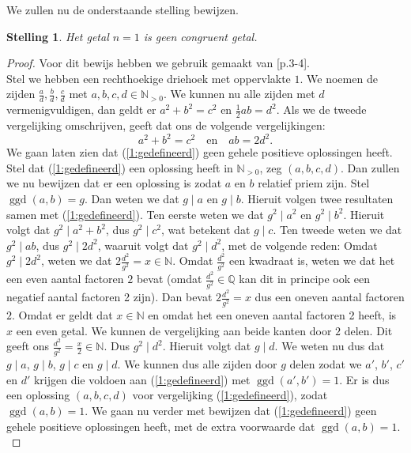 \documentclass[12pt,reqno]{article}
\newcommand*{\NN}{\ensuremath{\mathbb{N}}}
\newcommand*{\QQ}{\ensuremath{\mathbb{Q}}}
\newcommand*{\NO}{\ensuremath{\mathbb{N}_{>0}}}
\theoremstyle{theorem}
\newtheorem{theorem}{Stelling}
\theoremstyle{definition}
\DeclareMathOperator{\ggd}{ggd}
\begin{document}
	We zullen nu de onderstaande stelling bewijzen.
	\begin{theorem}
		Het getal $n=1$ is geen congruent getal.
	\end{theorem}
	\begin{proof}
		Voor dit bewijs hebben we gebruik gemaakt van \cite{Conrad}[p.3-4].\\
		Stel we hebben een rechthoekige driehoek met oppervlakte $1$. We noemen de zijden $\frac{a}{d}, \frac{b}{d}, \frac{c}{d}$ met $a,b,c,d\in\NO$. We kunnen nu alle zijden met $d$ vermenigvuldigen, dan geldt er $a^2 + b^2 = c ^2$ en $\frac{1}{2}ab = d^2$. Als we de tweede vergelijking omschrijven, geeft dat ons de volgende vergelijkingen:
		\begin{equation}\label{1:gedefineerd}
			a^2 + b^2 = c^2 \quad \text{en} \quad ab = 2d^2.
		\end{equation}
		We gaan laten zien dat (\ref{1:gedefineerd}) geen gehele positieve oplossingen heeft.\\
		
		Stel dat (\ref{1:gedefineerd}) een oplossing heeft in $\NO$, zeg $(a, b, c, d)$. Dan zullen we nu bewijzen dat er een oplossing is zodat $a$ en $b$ relatief priem zijn. Stel $\ggd(a,b) = g$. Dan weten we dat $g \mid a$ en $g \mid b$. Hieruit volgen twee resultaten samen met (\ref{1:gedefineerd}). Ten eerste weten we dat $g^2 \mid a^2$ en $g^2 \mid b^2$. Hieruit volgt dat $g^2 \mid a^2 + b^2$, dus $g^2 \mid c^2$, wat betekent dat $g \mid c$. Ten tweede weten we dat $g^2 \mid ab$, dus $g^2 \mid 2d^2$, waaruit volgt dat $g^2 \mid d^2$, met de volgende reden: Omdat $g^2 \mid 2d^2$, weten we dat $2\frac{d^2}{g^2} = x \in\NN$. Omdat $\frac{d^2}{g^2}$ een kwadraat is, weten we dat het een even aantal factoren $2$ bevat (omdat $\frac{d^2}{g^2}\in\QQ$ kan dit in principe ook een negatief aantal factoren 2 zijn). Dan bevat $2\frac{d^2}{g^2} = x$ dus een oneven aantal factoren $2$. Omdat er geldt dat $x \in\NN$ en omdat het een oneven aantal factoren 2 heeft, is $x$ een even getal. We kunnen de vergelijking aan beide kanten door $2$ delen. Dit geeft ons $\frac{d^2}{g^2}=\frac{x}{2} \in\NN$. Dus $g^2 \mid d^2$. Hieruit volgt dat $g \mid d$. We weten nu dus dat $g \mid a$, $g \mid b$, $g \mid c$ en $g \mid d$. We kunnen dus alle zijden door $g$ delen zodat we $a'$, $b'$, $c'$ en $d'$ krijgen die voldoen aan (\ref{1:gedefineerd}) met $\ggd(a',b') = 1$. Er is dus een oplossing $(a,b,c,d)$ voor vergelijking (\ref{1:gedefineerd}), zodat $\ggd(a,b)=1$. We gaan nu verder met bewijzen dat (\ref{1:gedefineerd}) geen gehele positieve oplossingen heeft, met de extra voorwaarde dat $\ggd(a,b) = 1$.\\
		

\end{proof}
\end{document}

